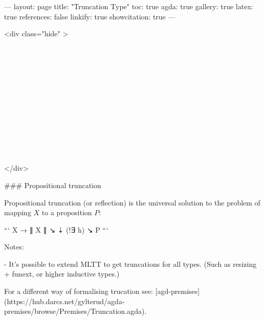 ---
layout: page
title: "Truncation Type"
toc: true
agda: true
gallery: true
latex: true
references: false
linkify: true
showcitation: true
---

<div class="hide" >
\begin{code}%
\>[0]\AgdaSymbol{\{-\#}\AgdaSpace{}%
\AgdaSpace{}%
\AgdaSpace{}%
\AgdaSymbol{\#-\}}\<%
\\
\>[0]\AgdaSpace{}%
\AgdaSpace{}%
\<%
\\
\>[0]\AgdaSpace{}%
\AgdaSpace{}%
\<%
\\
%
\\[\AgdaEmptyExtraSkip]%
\>[0]\AgdaSpace{}%
\AgdaSpace{}%
\<%
\\
\>[0]\AgdaSpace{}%
\AgdaSpace{}%
\<%
\\
\>[0]\AgdaSpace{}%
\AgdaSpace{}%
\<%
\\
\>[0]\AgdaSpace{}%
\AgdaSpace{}%
\<%
\\
\>[0]\AgdaSpace{}%
\AgdaSpace{}%
\<%
\\
\>[0]\AgdaSpace{}%
\AgdaSpace{}%
\<%
\\
\>[0]\AgdaSpace{}%
\AgdaSpace{}%
\<%
\\
\>[0]\AgdaSpace{}%
\AgdaSpace{}%
\<%
\end{code}
</div>

### Propositional truncation

Propositional truncation (or reflection) is the universal
solution to the problem of mapping $X$ to a proposition $P$:

```
X  → ∥ X ∥
 ↘    ⇣ (!∃ h)
    ↘ P 
```

Notes:

 - It's possible to extend MLTT to get truncations for all types.
 (Such as resizing + funext, or higher inductive types.)

For a different way of formalising trucation see:
[agd-premises](https://hub.darcs.net/gylterud/agda-premises/browse/Premises/Truncation.agda).


